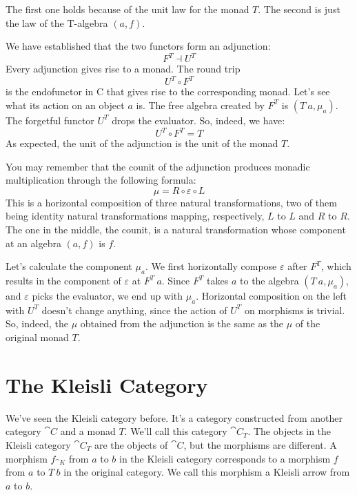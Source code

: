 \noindent
The first one holds because of the unit law for the monad $T$.
The second is just the law of the T-algebra $(a, f)$.

We have established that the two functors form an adjunction:
\[F^T \dashv U^T\]
Every adjunction gives rise to a monad. The round trip
\[U^T \circ F^T\]
is the endofunctor in C that gives rise to the corresponding monad.
Let's see what its action on an object $a$ is. The free algebra
created by $F^T$ is $(T\ a, \mu_a)$. The forgetful functor
$U^T$ drops the evaluator. So, indeed, we have:
\[U^T \circ F^T = T\]
As expected, the unit of the adjunction is the unit of the monad $T$.

You may remember that the counit of the adjunction produces monadic
multiplication through the following formula:
\[\mu = R \circ \varepsilon \circ L\]
This is a horizontal composition of three natural transformations, two
of them being identity natural transformations mapping, respectively,
$L$ to $L$ and $R$ to $R$. The one in the
middle, the counit, is a natural transformation whose component at an
algebra $(a, f)$ is $f$.

Let's calculate the component $\mu_a$. We first horizontally compose
$\varepsilon$ after $F^T$, which results in the component of
$\varepsilon$ at $F^T\ a$. Since $F^T$ takes $a$ to the
algebra $(T\ a, \mu_a)$, and $\varepsilon$ picks the evaluator, we end
up with $\mu_a$. Horizontal composition on the left with $U^T$
doesn't change anything, since the action of $U^T$ on morphisms is
trivial. So, indeed, the $\mu$ obtained from the adjunction is the
same as the $\mu$ of the original monad $T$.

\section{The Kleisli Category}

We've seen the Kleisli category before. It's a category constructed from
another category $\cat{C}$ and a monad $T$. We'll call this
category $\cat{C}_T$. The objects in the Kleisli category
$\cat{C}_T$ are the objects of $\cat{C}$, but the morphisms
are different. A morphism $f_{\cat{K}}$ from $a$ to $b$ in
the Kleisli category corresponds to a morphism $f$ from
$a$ to $T\ b$ in the original category. We call this
morphism a Kleisli arrow from $a$ to $b$.

